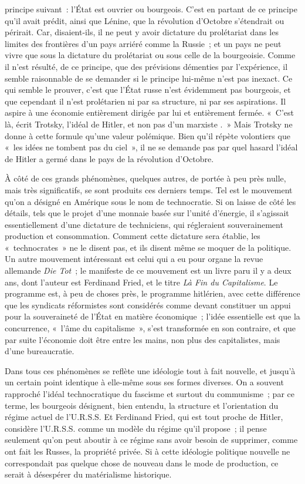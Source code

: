 \documentclass[french,twoside]{book} %
\begin{document}
principe suivant : l’État est ouvrier ou bourgeois. C'est en partant de ce principe qu'il avait prédit, ainsi que Lénine, que la révolution d'Octobre s'étendrait ou périrait. Car, disaient-ils, il ne peut y avoir dictature du prolétariat dans les limites des frontières d'un pays arriéré comme la Russie ; et un pays ne peut vivre que sous la dictature du prolétariat ou sous celle de la bourgeoisie. Comme il n'est résulté, de ce principe, que des prévisions démenties par l'expérience, il semble raisonnable de se demander si le principe lui-même n'est pas inexact. Ce qui semble le prouver, c'est que l’État russe n'est évidemment pas bourgeois, et que cependant il n'est prolétarien ni par sa structure, ni par ses aspirations. Il aspire à une économie entièrement dirigée par lui et entièrement fermée. « C'est là, écrit Trotsky, l'idéal de Hitler, et non pas d'un marxiste . » Mais Trotsky ne donne à cette formule qu'une valeur polémique. Bien qu'il répète volontiers que « les idées ne tombent pas du ciel », il ne se demande pas par quel hasard l'idéal de Hitler a germé dans le pays de la révolution d'Octobre.\par
À côté de ces grands phénomènes, quelques autres, de portée à peu près nulle, mais très significatifs, se sont produits ces derniers temps. Tel est le mouvement qu'on a désigné en Amérique sous le nom de technocratie. Si on laisse de côté les détails, tels que le projet d'une monnaie basée sur l'unité d'énergie, il s'agissait essentiellement d'une dictature de techniciens, qui régleraient souverainement production et consommation. Comment cette dictature sera établie, les « technocrates » ne le disent pas, et ils disent même se moquer de la politique. Un autre mouvement intéressant est celui qui a eu pour organe la revue allemande {\itshape Die Tot} ; le manifeste de ce mouvement est un livre paru il y a deux ans, dont l'auteur est Ferdinand Fried, et le titre {\itshape Là Fin du Capitalisme}. Le programme est, à peu de choses près, le programme hitlérien, avec cette différence que les syndicats réformistes sont considérés comme devant constituer un appui pour la souveraineté de l’État en matière économique ; l'idée essentielle est que la concurrence, « l’âme du capitalisme », s'est transformée en son contraire, et que par suite l'économie doit être entre les mains, non plus des capitalistes, mais d'une bureaucratie.\par
Dans tous ces phénomènes se reflète une idéologie tout à fait nouvelle, et jusqu'à un certain point identique à elle-même sous ses formes diverses. On a souvent rapproché l'idéal technocratique du fascisme et surtout du communisme ; par ce terme, les bourgeois désignent, bien entendu, la structure et l'orientation du régime actuel de l'U.R.S.S. Et Ferdinand Fried, qui est tout proche de Hitler, considère l'U.R.S.S. comme un modèle du régime qu'il propose ; il pense seulement qu'on peut aboutir à ce régime sans avoir besoin de supprimer, comme ont fait les Russes, la propriété privée. Si à cette idéologie politique nouvelle ne correspondait pas quelque chose de nouveau dans le mode de production, ce serait à désespérer du matérialisme historique.\par
\end{document}
